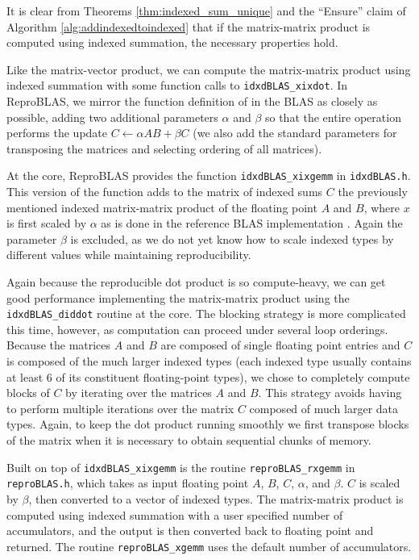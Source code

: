   It is clear from Theorems \ref{thm:indexed_sum_unique} and the ``Ensure'' claim of Algorithm \ref{alg:addindexedtoindexed} that if the matrix-matrix product is computed using indexed summation, the necessary properties hold.

  Like the matrix-vector product, we can compute the matrix-matrix product using indexed summation with some function calls to \texttt{idxdBLAS\_xixdot}. In ReproBLAS, we mirror the function definition of  in the BLAS as closely as possible, adding two additional parameters $\alpha$ and $\beta$ so that the entire operation performs the update $C \gets \alpha AB + \beta C$ (we also add the standard parameters for transposing the matrices and selecting ordering of all matrices).

  At the core, ReproBLAS provides the function \texttt{idxdBLAS\_xixgemm} in \texttt{idxdBLAS.h}. This version of the function adds to the matrix of indexed sums $C$ the previously mentioned indexed matrix-matrix product of the floating point $A$ and $B$, where $x$ is first scaled by $\alpha$ as is done in the reference BLAS implementation \cite{BLAS}. Again the parameter $\beta$ is excluded, as we do not yet know how to scale indexed types by different values while maintaining reproducibility.

  Again because the reproducible dot product is so compute-heavy, we can get good performance implementing the matrix-matrix product using the \texttt{idxdBLAS\_diddot} routine at the core. The blocking strategy is more complicated this time, however, as computation can proceed under several loop orderings. Because the matrices $A$ and $B$ are composed of single floating point entries and $C$ is composed of the much larger indexed types (each indexed type usually contains at least 6 of its constituent floating-point types), we chose to completely compute blocks of $C$ by iterating over the matrices $A$ and $B$. This strategy avoids having to perform multiple iterations over the matrix $C$ composed of much larger data types. Again, to keep the dot product running smoothly we first transpose blocks of the matrix when it is necessary to obtain sequential chunks of memory.

  Built on top of \texttt{idxdBLAS\_xixgemm} is the routine \texttt{reproBLAS\_rxgemm} in \texttt{reproBLAS.h}, which takes as input floating point $A$, $B$, $C$, $\alpha$, and $\beta$. $C$ is scaled by $\beta$, then converted to a vector of indexed types. The matrix-matrix product is computed using indexed summation with a user specified number of accumulators, and the output is then converted back to floating point and returned. The routine \texttt{reproBLAS\_xgemm} uses the default number of accumulators.
